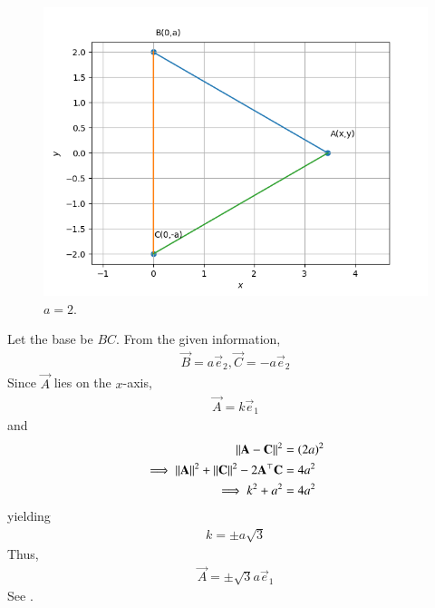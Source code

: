 	\begin{figure}[!ht]
		\centering
 \includegraphics[width=\columnwidth]{chapters/11/10/1/2/figs/triangle.png}
		\caption{$a = 2$.}
		\label{fig:11/10/1/2}
  	\end{figure}
	Let the base be $BC$.  From the given information, 
\begin{align}
	\vec{B} = a\vec{e}_2,
	\vec{C} = -a\vec{e}_2
\end{align}
Since $\vec{A}$ lies on the $x$-axis, 
\begin{align}
	\vec{A} = k\vec{e}_1
\end{align}
and 
\begin{align}
	\left\lVert\mathbf{A}-\mathbf{C}\right\rVert^2 &= \left(2a\right)^2
	\\
	\implies \left\lVert\mathbf{A}\right\rVert^2+\left\lVert\mathbf{C}\right\rVert^2 - 2 \mathbf{A}^{\top}\mathbf{C} &= 4a^2
	\\
	\implies k^2 +a^2 &= 4a^2
\end{align}
yielding
\begin{align}
 k = \pm a\sqrt{3}
\end{align}
Thus, 
\begin{align}
	\vec{A} = \pm \sqrt{3}a\vec{e}_1
\end{align}
		See .

